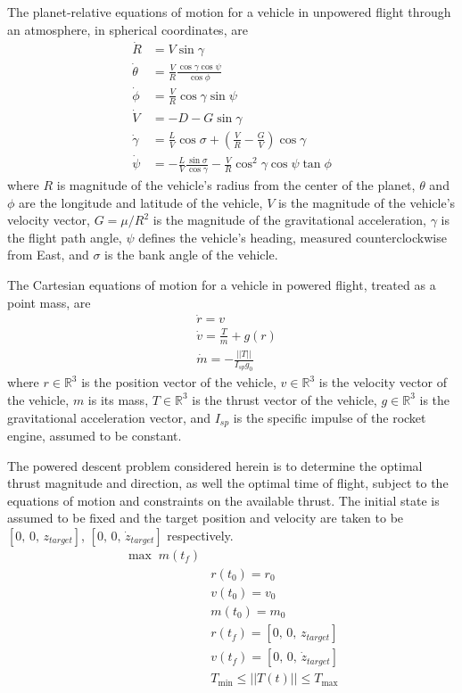 \documentclass[letterpaper, preprint, paper,11pt]{AAS}
\begin{document}
The planet-relative equations of motion for a vehicle in unpowered flight through an atmosphere, in spherical coordinates, are
\begin{align}
\dot{R} &= V\sin\gamma\\
\dot{\theta} &= \frac{V}{R}\frac{\cos\gamma\cos\psi}{\cos\phi}\\
\dot{\phi} &= \frac{V}{R}\cos\gamma\sin\psi \\
\dot{V} &= -D - G\sin\gamma \\
\dot{\gamma} &= \frac{L}{V}\cos\sigma + (\frac{V}{R}-\frac{G}{V})\cos\gamma \\
\dot{\psi} &= -\frac{L}{V}\frac{\sin\sigma}{\cos\gamma} - \frac{V}{R}\cos^2\gamma\cos\psi\tan\phi
\end{align}
where $R$ is magnitude of the vehicle's radius from the center of the planet, $\theta$ and $\phi$ are the longitude and latitude of the vehicle, $V$ is the magnitude of the vehicle's velocity vector,  $G=\mu/R^2$ is the magnitude of the gravitational acceleration, $\gamma$ is the flight path angle, $\psi$ defines the vehicle's heading, measured counterclockwise from East, and $\sigma$ is the bank angle of the vehicle. 

The Cartesian equations of motion for a vehicle in powered flight, treated as a point mass, are
\begin{align}
&\dot{r} = v  \\
&\dot{v} = \frac{T}{m} + g(r) \\
&\dot{m} = -\frac{||T||}{I_{sp}g_0}
\end{align}
where $r\in\mathbb{R}^3$ is the position vector of the vehicle, $v\in\mathbb{R}^3$ is the velocity vector of the vehicle, $m$ is its mass, $T\in\mathbb{R}^3$ is the thrust vector of the vehicle, $g\in\mathbb{R}^3$ is the gravitational acceleration vector, and $I_{sp}$ is the specific impulse of the rocket engine, assumed to be constant. 

The powered descent problem considered herein is to determine the optimal thrust magnitude and direction, as well the optimal time of flight, subject to the equations of motion and constraints on the available thrust.  The initial state is assumed to be fixed and the target position and velocity are taken to be $[0,\, 0,\, z_{target}]$,  $[0,\, 0,\, \dot{z}_{target}]$ respectively. 
\begin{align}
\max \;m(t_f) \\
&r(t_0) = r_0 \\
&v(t_0) = v_0 \\
&m(t_0) = m_0\\
&r(t_f) = [0,\, 0,\, z_{target}] \\
&v(t_f) = [0,\, 0,\, \dot{z}_{target}] \\
&T_{\min} \le ||T(t)|| \le T_{\max}
\end{align}
\end{document}
